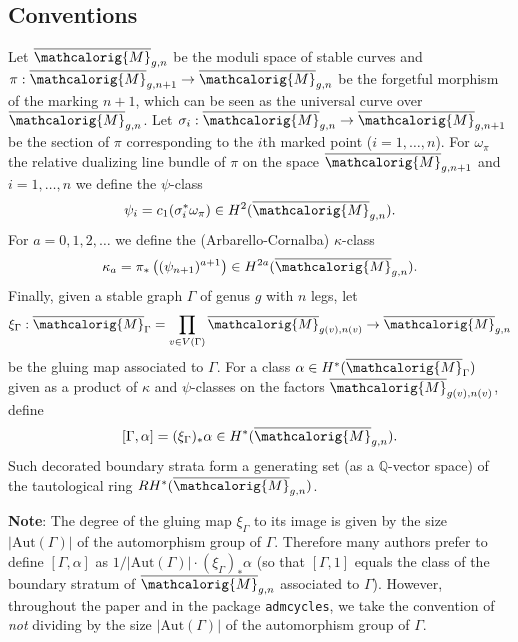 \documentclass[11pt]{article}
\newcommand{\M}{\ensuremath{\overline{\mathcalorig{M}}}}
\newcommand{\admcycles}{\texttt{admcycles}}
\begin{document}
\subsection{Conventions} \label{Sect:conventions}
Let $\M_{g,n}$ be the moduli space of stable curves and $\pi: \M_{g,n+1} \to \M_{g,n}$ be the forgetful morphism of the marking $n+1$, which can be seen as the universal curve over $\M_{g,n}$. Let $\sigma_i : \M_{g,n} \to \M_{g,n+1}$ be the section of $\pi$ corresponding to the $i$th marked point ($i=1, \ldots, n$). For $\omega_\pi$ the relative dualizing line bundle of $\pi$ on the space $\M_{g,n+1}$ and $i=1, \ldots, n$ we define the $\psi$-class
\[\psi_i = c_1( \sigma_i^* \omega_\pi) \in H^2(\M_{g,n}).\]
For $a=0,1,2, \ldots$ we define the (Arbarello-Cornalba) $\kappa$-class
\[\kappa_a = \pi_* \left( (\psi_{n+1})^{a+1} \right) \in H^{2a}(\M_{g,n}).\]
Finally, given a stable graph $\Gamma$ of genus $g$ with $n$ legs, let
\[\xi_\Gamma : \M_\Gamma = \prod_{v \in V(\Gamma)} \M_{g(v),n(v)} \to \M_{g,n}\]
be the gluing map associated to $\Gamma$. For a class $\alpha \in H^*(\M_\Gamma)$ given as a product of $\kappa$ and $\psi$-classes on the factors $\M_{g(v),n(v)}$, define
\[[\Gamma, \alpha] = (\xi_\Gamma)_* \alpha \in H^*(\M_{g,n}).\]
Such decorated boundary strata form a generating set (as a $\mathbb{Q}$-vector space) of the tautological ring $RH^*(\M_{g,n})$.

\textbf{Note}: The degree of the gluing map $\xi_\Gamma$ to its image is given by the size $|\text{Aut}(\Gamma)|$ of the automorphism group of $\Gamma$. Therefore many authors prefer to define $[\Gamma, \alpha]$ as $1/|\text{Aut}(\Gamma)| \cdot (\xi_\Gamma)_* \alpha$ (so that $[\Gamma,1]$ equals the class of the boundary stratum of $\M_{g,n}$ associated to $\Gamma$). However, throughout the paper and in the package \admcycles{}, we take the convention of \emph{not} dividing by the size $|\text{Aut}(\Gamma)|$ of the automorphism group of $\Gamma$.



\end{document}

